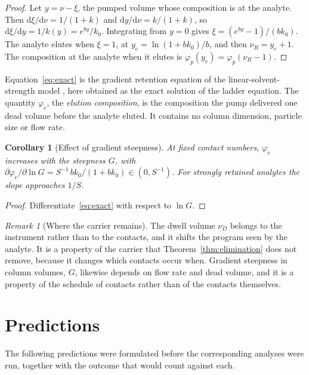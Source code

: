 \documentclass[11pt,a4paper]{article}
\newtheorem{corollary}[theorem]{Corollary}
\theoremstyle{definition}
\theoremstyle{remark}
\newtheorem{remark}[theorem]{Remark}
\newcommand{\dd}{\mathrm{d}}
\begin{document}
\begin{proof}
Let $y=\nu-\xi$, the pumped volume whose composition is at the analyte.
Then $\dd\xi/\dd\nu=1/(1+k)$ and $\dd y/\dd\nu=k/(1+k)$, so $\dd\xi/\dd y=1/k(y)=e^{by}/k_0$.
Integrating from $y=0$ gives $\xi=(e^{by}-1)/(bk_0)$.
The analyte elutes when $\xi=1$, at $y_e=\ln(1+bk_0)/b$, and then $\nu_R=y_e+1$.
The composition at the analyte when it elutes is $\varphi_p(y_e)=\varphi_p(\nu_R-1)$.
\end{proof}

Equation~\eqref{eq:exact} is the gradient retention equation of the linear-solvent-strength model \citep{snyder2007}, here obtained as the exact solution of the ladder equation.
The quantity $\varphi_e$, the \emph{elution composition}, is the composition the pump delivered one dead volume before the analyte eluted.
It contains no column dimension, particle size or flow rate.

\begin{corollary}[Effect of gradient steepness]
\label{cor:steepness}
At fixed contact numbers, $\varphi_e$ increases with the steepness $G$, with $\partial\varphi_e/\partial\ln G=S^{-1}\,bk_0/(1+bk_0)\in(0,S^{-1})$.
For strongly retained analytes the slope approaches $1/S$.
\end{corollary}

\begin{proof}
Differentiate~\eqref{eq:exact} with respect to $\ln G$.
\end{proof}

\begin{remark}[Where the carrier remains]
\label{rem:dwell}
The dwell volume $\nu_D$ belongs to the instrument rather than to the contacts, and it shifts the program seen by the analyte.
It is a property of the carrier that Theorem~\ref{thm:elimination} does not remove, because it changes which contacts occur when.
Gradient steepness in column volumes, $G$, likewise depends on flow rate and dead volume, and it is a property of the schedule of contacts rather than of the contacts themselves.
\end{remark}

\section{Predictions}
\label{sec:predictions}

The following predictions were formulated before the corresponding analyses were run, together with the outcome that would count against each.
\end{document}
